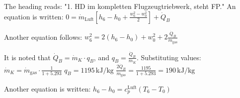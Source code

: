 The heading reads: "1. HD im kompletten Flugzeugtriebwerk, steht FP."  
An equation is written:  
\( 0 = \dot{m}_{\text{Luft}} \left[ h_6 - h_0 + \frac{w_6^2 - w_0^2}{2} \right] + \dot{Q}_B \)  

Another equation follows:  
\( w_6^2 = 2 \left( h_6 - h_0 \right) + w_0^2 + 2 \frac{\dot{Q}_B}{\dot{m}_{\text{gas}}} \)  

It is noted that \( \dot{Q}_B = \dot{m}_K \cdot q_B \), and \( q_B = \frac{\dot{Q}_B}{\dot{m}_K} \).  
Substituting values:  
\( \dot{m}_K = \dot{m}_{\text{gas}} \cdot \frac{1}{1 + 5.293} \)  
\( q_B = 1195 \, \text{kJ/kg} \)  
\( \frac{2 \dot{Q}_B}{\dot{m}_{\text{gas}}} = \frac{1195}{1 + 5.293} = 190 \, \text{kJ/kg} \)  

Another equation is written:  
\( h_6 - h_0 = c_p^{\text{Luft}} \left( T_6 - T_0 \right) \)